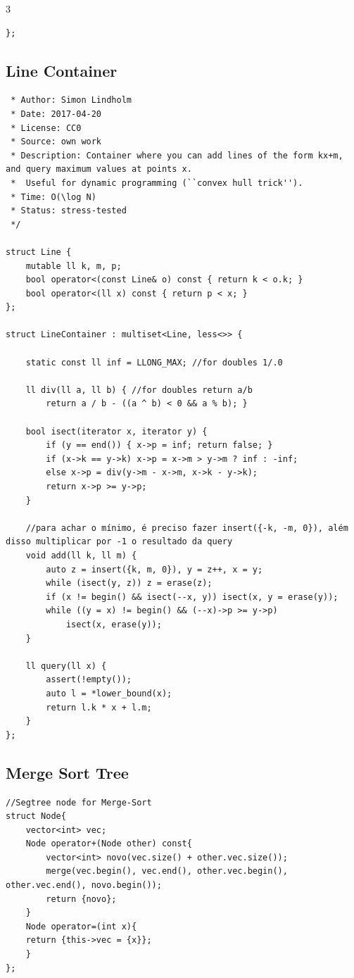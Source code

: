 \documentclass[9pt, a4paper, notitlepage]{extreport}
\begin{document}
\begin{multicols}{3}
\begin{verbatim}
};
\end{verbatim}

\subsection{Line Container}
\begin{verbatim}
 * Author: Simon Lindholm
 * Date: 2017-04-20
 * License: CC0
 * Source: own work
 * Description: Container where you can add lines of the form kx+m, and query maximum values at points x.
 *  Useful for dynamic programming (``convex hull trick'').
 * Time: O(\log N)
 * Status: stress-tested
 */

struct Line {
	mutable ll k, m, p;
	bool operator<(const Line& o) const { return k < o.k; }
	bool operator<(ll x) const { return p < x; }
}; 

struct LineContainer : multiset<Line, less<>> {

	static const ll inf = LLONG_MAX; //for doubles 1/.0
	
    ll div(ll a, ll b) { //for doubles return a/b
		return a / b - ((a ^ b) < 0 && a % b); }

	bool isect(iterator x, iterator y) {
		if (y == end()) { x->p = inf; return false; }
		if (x->k == y->k) x->p = x->m > y->m ? inf : -inf;
		else x->p = div(y->m - x->m, x->k - y->k);
		return x->p >= y->p;
	} 
	
    //para achar o mínimo, é preciso fazer insert({-k, -m, 0}), além disso multiplicar por -1 o resultado da query
    void add(ll k, ll m) {
		auto z = insert({k, m, 0}), y = z++, x = y;
		while (isect(y, z)) z = erase(z);
		if (x != begin() && isect(--x, y)) isect(x, y = erase(y));
		while ((y = x) != begin() && (--x)->p >= y->p) 
			isect(x, erase(y));
	}

	ll query(ll x) {
		assert(!empty());
        auto l = *lower_bound(x);
		return l.k * x + l.m;
	}
};
\end{verbatim}

\subsection{Merge Sort Tree}
\begin{verbatim}
//Segtree node for Merge-Sort
struct Node{
    vector<int> vec;
    Node operator+(Node other) const{
        vector<int> novo(vec.size() + other.vec.size());
        merge(vec.begin(), vec.end(), other.vec.begin(), other.vec.end(), novo.begin());
        return {novo};
    }
    Node operator=(int x){
    return {this->vec = {x}};
    }
};
\end{verbatim}


\end{multicols}
\end{document}

